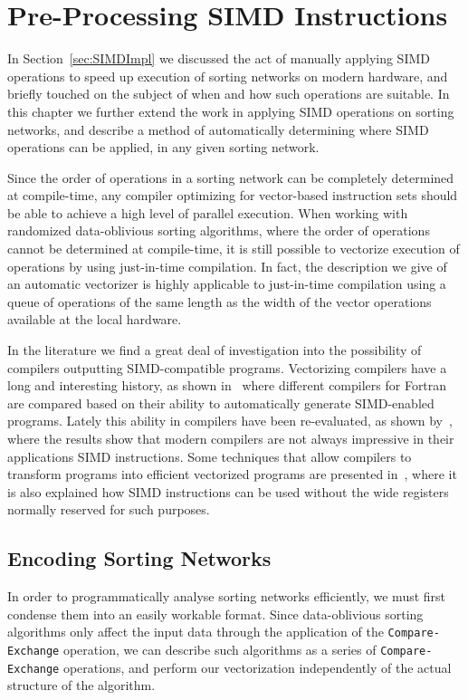 \chapter{Pre-Processing SIMD Instructions}
\label{ch:SIMDerize}

In Section~\ref{sec:SIMDImpl} we discussed the act of manually applying SIMD operations to speed up execution of sorting networks on modern hardware, and briefly touched on the subject of when and how such operations are suitable. In this chapter we further extend the work in applying SIMD operations on sorting networks, and describe a method of automatically determining where SIMD operations can be applied, in any given sorting network.

Since the order of operations in a sorting network can be completely determined at compile-time, any compiler optimizing for vector-based instruction sets should be able to achieve a high level of parallel execution. When working with randomized data-oblivious sorting algorithms, where the order of operations cannot be determined at compile-time, it is still possible to vectorize execution of operations by using just-in-time compilation. In fact, the description we give of an automatic vectorizer is highly applicable to just-in-time compilation using a queue of operations of the same length as the width of the vector operations available at the local hardware.

In the literature we find a great deal of investigation into the possibility of compilers outputting SIMD-compatible programs. Vectorizing compilers have a long and interesting history, as shown in~ where different compilers for Fortran are compared based on their ability to automatically generate SIMD-enabled programs. Lately this ability in compilers have been re-evaluated, as shown by~, where the results show that modern compilers are not always impressive in their applications SIMD instructions. Some techniques that allow compilers to transform programs into efficient vectorized programs are presented in~, where it is also explained how SIMD instructions can be used without the wide registers normally reserved for such purposes.  

\section{Encoding Sorting Networks}

In order to programmatically analyse sorting networks efficiently, we must first condense them into an easily workable format. Since data-oblivious sorting algorithms only affect the input data through the application of the \texttt{Compare-Exchange} operation, we can describe such algorithms as a series of \texttt{Compare-Exchange} operations, and perform our vectorization independently of the actual structure of the algorithm.

